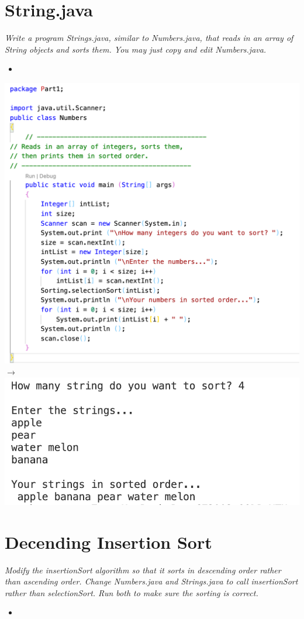 \documentclass[hidelinks,12pt]{article}
\begin{document}
\section{String.java}
\textit{Write a program Strings.java, similar to Numbers.java, that reads in an array of String objects and sorts
them. You may just copy and edit Numbers.java.}
\begin{itemize}
    \item[] 
\end{itemize}
\includegraphics[scale=0.4]{StringCode.png}
$\longrightarrow$ \includegraphics[scale=0.5]{StringsResult.png}
\newpage
\section{Decending Insertion Sort}
\textit{Modify the insertionSort algorithm so that it sorts in descending order rather than ascending order.
Change Numbers.java and Strings.java to call insertionSort rather than selectionSort. Run both to make
sure the sorting is correct.}
\begin{itemize}
    \item[] 
\end{itemize}
\end{document}
